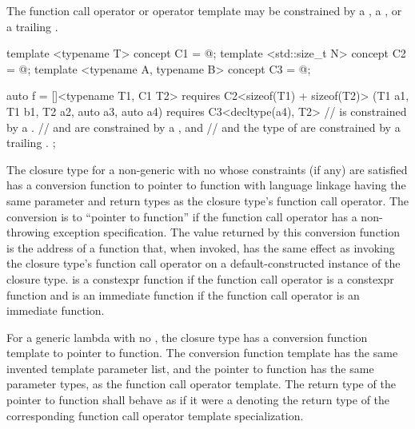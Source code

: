 \pnum
\begin{note}
The function call operator or operator template may be constrained
by a ,
a ,
or a trailing .
\begin{example}
\begin{codeblock}
template <typename T> concept C1 = @\commentellip@;
template <std::size_t N> concept C2 = @\commentellip@;
template <typename A, typename B> concept C3 = @\commentellip@;

auto f = []<typename T1, C1 T2> requires C2<sizeof(T1) + sizeof(T2)>
         (T1 a1, T1 b1, T2 a2, auto a3, auto a4) requires C3<decltype(a4), T2> {
  //  is constrained by a .
  //  and  are constrained by a , and
  //  and the type of  are constrained by a trailing .
};
\end{codeblock}
\end{example}
\end{note}

\pnum
The closure type for a non-generic  with no
whose constraints (if any) are satisfied
has a conversion function to pointer to
function with \Cpp{} language linkage having
the same parameter and return types as the closure type's function call operator.
The conversion is to ``pointer to  function''
if the function call operator
has a non-throwing exception specification.
The value returned by this conversion function
is the address of a function  that, when invoked,
has the same effect as invoking the closure type's function call operator
on a default-constructed instance of the closure type.
 is a constexpr function
if the function call operator is a constexpr function
and is an immediate function
if the function call operator is an immediate function.

\pnum
For a generic lambda with no , the closure type has a
conversion function template to
pointer to function. The conversion function template has the same invented
template parameter list, and the pointer to function has the same
parameter types, as the function call operator template.  The return type of
the pointer to function shall behave as if it were a
 denoting the return type of the corresponding
function call operator template specialization.


